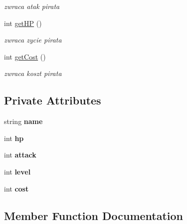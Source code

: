 \begin{DoxyCompactItemize}
\begin{DoxyCompactList}\small\item\em zwraca atak pirata \end{DoxyCompactList}\item 
\mbox{\label{class_crew_member_aae0cd068de1105bf494869b3ad1c7bbd}} 
int \hyperlink{class_crew_member_aae0cd068de1105bf494869b3ad1c7bbd}{get\+HP} ()
\begin{DoxyCompactList}\small\item\em zwraca zycie pirata \end{DoxyCompactList}\item 
\mbox{\label{class_crew_member_a72be72a3277cb26d86e67687c46e3b3f}} 
int \hyperlink{class_crew_member_a72be72a3277cb26d86e67687c46e3b3f}{get\+Cost} ()
\begin{DoxyCompactList}\small\item\em zwraca koszt pirata \end{DoxyCompactList}\end{DoxyCompactItemize}
\subsection*{Private Attributes}
\begin{DoxyCompactItemize}
\item 
\mbox{\label{class_crew_member_ab9f3e58997898231c8f06c76bf23e05c}} 
string {\bfseries name}
\item 
\mbox{\label{class_crew_member_a8a9f8b4c1ad00a40dd046a79a6520c1d}} 
int {\bfseries hp}
\item 
\mbox{\label{class_crew_member_acb0734a3329c026823ceff5bb747c41b}} 
int {\bfseries attack}
\item 
\mbox{\label{class_crew_member_af5918f0447a3c0179e1d73f480bacde5}} 
int {\bfseries level}
\item 
\mbox{\label{class_crew_member_a1ed9569727f18d31fa74679c6c72e3c3}} 
int {\bfseries cost}
\end{DoxyCompactItemize}


\subsection{Member Function Documentation}
\mbox{\label{class_crew_member_a3b22e0361d970a65120f4f83be61a506}} 
